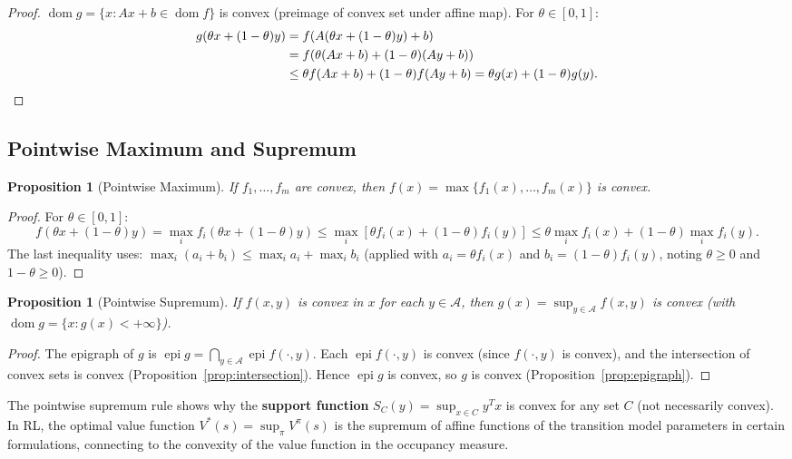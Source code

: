 \documentclass[11pt,a4paper]{article}
\newtheorem{proposition}[theorem]{Proposition}
\theoremstyle{definition}
\theoremstyle{remark}
\DeclareMathOperator{\dom}{dom}
\DeclareMathOperator{\epi}{epi}
\begin{document}
\begin{proof}
$\dom g = \{x : Ax + b \in \dom f\}$ is convex (preimage of convex set under affine
map). For $\theta \in [0,1]$:
\begin{align*}
  g(\theta x + (1-\theta) y) &= f(A(\theta x + (1-\theta)y) + b) \\
  &= f(\theta(Ax+b) + (1-\theta)(Ay+b)) \\
  &\le \theta f(Ax+b) + (1-\theta) f(Ay+b) = \theta g(x) + (1-\theta) g(y). \qedhere
\end{align*}
\end{proof}

\subsection{Pointwise Maximum and Supremum}

\begin{proposition}[Pointwise Maximum]
\label{prop:pointwise-max}
If $f_1, \ldots, f_m$ are convex, then $f(x) = \max\{f_1(x), \ldots, f_m(x)\}$ is
convex.
\end{proposition}

\begin{proof}
For $\theta \in [0,1]$:
\[
  f(\theta x + (1-\theta)y) = \max_i f_i(\theta x + (1-\theta) y)
  \le \max_i [\theta f_i(x) + (1-\theta) f_i(y)]
  \le \theta \max_i f_i(x) + (1-\theta) \max_i f_i(y).
\]
The last inequality uses: $\max_i (a_i + b_i) \le \max_i a_i + \max_i b_i$ (applied
with $a_i = \theta f_i(x)$ and $b_i = (1-\theta) f_i(y)$, noting $\theta \ge 0$ and
$1-\theta \ge 0$).
\end{proof}

\begin{proposition}[Pointwise Supremum]
\label{prop:pointwise-sup}
If $f(x, y)$ is convex in $x$ for each $y \in \mathcal{A}$, then
$g(x) = \sup_{y \in \mathcal{A}} f(x, y)$ is convex (with $\dom g = \{x :
g(x) < +\infty\}$).
\end{proposition}

\begin{proof}
The epigraph of $g$ is $\epi g = \bigcap_{y \in \mathcal{A}} \epi f(\cdot, y)$. Each
$\epi f(\cdot, y)$ is convex (since $f(\cdot, y)$ is convex), and the intersection of
convex sets is convex (Proposition~\ref{prop:intersection}). Hence $\epi g$ is convex,
so $g$ is convex (Proposition~\ref{prop:epigraph}).
\end{proof}

\begin{rlconnection}
The pointwise supremum rule shows why the \textbf{support function}
$S_C(y) = \sup_{x \in C} y^T x$ is convex for any set $C$ (not necessarily convex).
In RL, the optimal value function $V^*(s) = \sup_\pi V^\pi(s)$ is the supremum of
affine functions of the transition model parameters in certain formulations, connecting
to the convexity of the value function in the occupancy measure.
\end{rlconnection}
\end{document}
